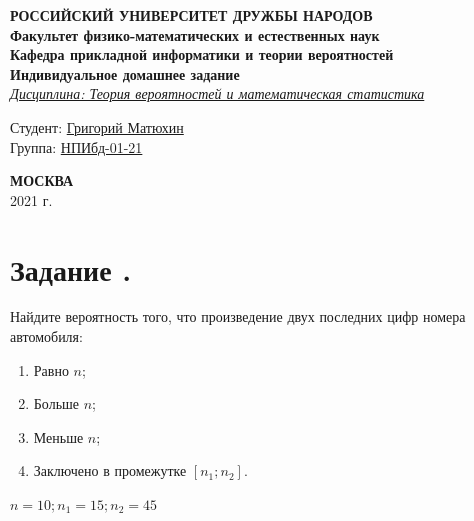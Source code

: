 \documentclass[12pt]{article}
\begin{document}
\begin{titlepage}

	\begin{center}
		\hfill \break
		\textbf{
			\large{РОССИЙСКИЙ УНИВЕРСИТЕТ ДРУЖБЫ НАРОДОВ}\\
			\normalsize{Факультет физико-математических и естественных наук}\\
			\normalsize{Кафедра прикладной информатики и теории вероятностей}\\
		}
		\vspace*{\fill}
		\Large{\textbf{Индивидуальное домашнее задание }}
		\\
		\underline{\textit{\normalsize{Дисциплина: Теория вероятностей и математическая статистика}}}
		\vspace*{\fill}

	\end{center}

	\begin{flushright}
		Студент: \underline{Григорий Матюхин}\\ \vspace{0.5cm}
		Группа: \underline{НПИбд-01-21}
	\end{flushright}


	\begin{center} \textbf{МОСКВА} \\ 2021 г. \end{center}
	\thispagestyle{empty} %

\end{titlepage}
\newpage
\tableofcontents
\newpage

\section*{Задание .}
Найдите вероятность того, что произведение двух последних цифр номера автомобиля:
\begin{enumerate}
	\item Равно $n$;
	\item Больше $n$;
	\item Меньше $n$;
	\item Заключено в промежутке $[n_1; n_2]$.
\end{enumerate}
$n = 10; n_1 = 15; n_2 = 45$
\end{document}
